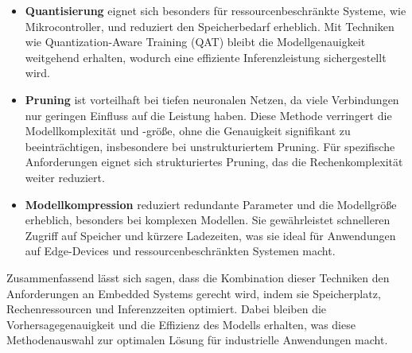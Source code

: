     \begin{itemize}
        \item \textbf{Quantisierung} eignet sich besonders für ressourcenbeschränkte Systeme, wie Mikrocontroller, und reduziert den Speicherbedarf erheblich. Mit Techniken wie Quantization-Aware Training (QAT) bleibt die Modellgenauigkeit weitgehend erhalten, wodurch eine effiziente Inferenzleistung sichergestellt wird.
        
        \item \textbf{Pruning} ist vorteilhaft bei tiefen neuronalen Netzen, da viele Verbindungen nur geringen Einfluss auf die Leistung haben. Diese Methode verringert die Modellkomplexität und -größe, ohne die Genauigkeit signifikant zu beeinträchtigen, insbesondere bei unstrukturiertem Pruning. Für spezifische Anforderungen eignet sich strukturiertes Pruning, das die Rechenkomplexität weiter reduziert.
        
        \item \textbf{Modellkompression} reduziert redundante Parameter und die Modellgröße erheblich, besonders bei komplexen Modellen. Sie gewährleistet schnelleren Zugriff auf Speicher und kürzere Ladezeiten, was sie ideal für Anwendungen auf Edge-Devices und ressourcenbeschränkten Systemen macht.
    
    \end{itemize}
    
Zusammenfassend lässt sich sagen, dass die Kombination dieser Techniken den Anforderungen an Embedded Systems gerecht wird, indem sie Speicherplatz, Rechenressourcen und Inferenzzeiten optimiert. 
Dabei bleiben die Vorhersagegenauigkeit und die Effizienz des Modells erhalten, was diese Methodenauswahl zur optimalen Lösung für industrielle Anwendungen macht.

